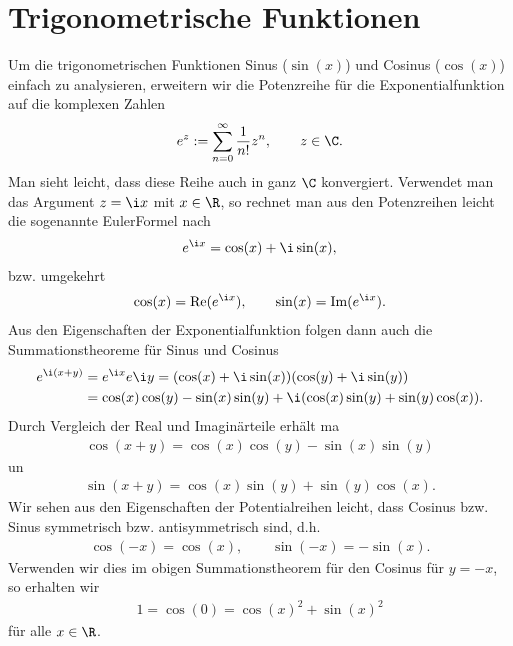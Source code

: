 \documentclass[letterpaper,10pt,english]{jupyterBook}
\begin{document}
\section{Trigonometrische Funktionen}
\label{\detokenize{stetigkeit/trig:trigonometrische-funktionen}}\label{\detokenize{stetigkeit/trig::doc}}
Um die trigonometrischen Funktionen Sinus (\(\sin(x)\)) und Cosinus (\(\cos(x)\)) einfach zu analysieren, erweitern wir die Potenzreihe für die Exponentialfunktion auf die komplexen Zahlen
\begin{equation*}
\begin{split} e^z:= \sum_{n=0}^\infty \frac{1}{n!} z^n, \qquad z \in \C.\end{split}
\end{equation*}
Man sieht leicht, dass diese Reihe auch in ganz \(\C\) konvergiert. Verwendet man das Argument \(z=\i x\) mit \(x \in \R\), so rechnet man aus den Potenzreihen leicht die sogenannte Euler\sphinxhyphen{}Formel nach
\begin{equation*}
\begin{split} e^{\i x} = \cos(x) + \i \sin(x),\end{split}
\end{equation*}
bzw. umgekehrt
\begin{equation*}
\begin{split} \cos(x) = \text{Re}(e^{\i x}), \qquad \sin(x) = \text{Im}(e^{\i x}).\end{split}
\end{equation*}
Aus den Eigenschaften der Exponentialfunktion folgen dann auch die Summationstheoreme für Sinus und Cosinus
\begin{align*}
e^{\i (x+y)} &= e^{\i x}e{\i y} = (\cos(x) + \i \sin(x)) (\cos(y) + \i \sin(y))  \\
&= \cos(x) \cos(y) - \sin(x) \sin(y) + \i ( \cos(x) \sin(y) + \sin(y) \cos(x)).
\end{align*}
Durch Vergleich der Real\sphinxhyphen{} und Imaginärteile erhält ma
\begin{equation*}
\begin{split} \cos(x+y) = \cos(x) \cos(y) - \sin(x) \sin(y)\end{split}
\end{equation*}
un
\begin{equation*}
\begin{split} \sin(x+y) =  \cos(x) \sin(y) + \sin(y) \cos(x).\end{split}
\end{equation*}
Wir sehen aus den Eigenschaften der Potentialreihen leicht, dass Cosinus bzw. Sinus symmetrisch bzw. antisymmetrisch sind, d.h.
\begin{equation*}
\begin{split} \cos(-x) = \cos(x)  , \qquad \sin(-x) = -\sin(x) .\end{split}
\end{equation*}
Verwenden wir dies im obigen Summationstheorem für den Cosinus für \(y=-x\), so erhalten wir
\begin{equation*}
\begin{split} 1 = \cos(0) = \cos(x)^2 + \sin(x)^2\end{split}
\end{equation*}
für alle \(x \in \R\).
\end{document}
